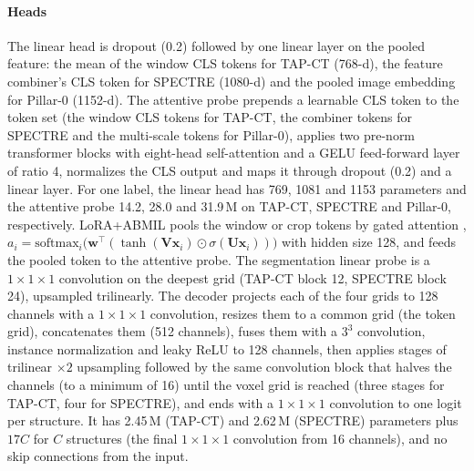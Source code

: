 \paragraph{Heads} The linear head is dropout (0.2) followed by one linear layer on the pooled feature: the mean of the window CLS tokens for TAP-CT (768-d), the feature combiner's CLS token for SPECTRE (1080-d) and the pooled image embedding for Pillar-0 (1152-d). The attentive probe prepends a learnable CLS token to the token set (the window CLS tokens for TAP-CT, the combiner tokens for SPECTRE and the multi-scale tokens for Pillar-0), applies two pre-norm transformer blocks with eight-head self-attention and a GELU feed-forward layer of ratio 4, normalizes the CLS output and maps it through dropout (0.2) and a linear layer. For one label, the linear head has 769, 1081 and 1153 parameters and the attentive probe 14.2, 28.0 and 31.9\,M on TAP-CT, SPECTRE and Pillar-0, respectively. LoRA+ABMIL pools the window or crop tokens by gated attention \citep{ilse2018abmil}, $a_i=\mathrm{softmax}_i\big(\bm{w}^\top(\tanh(\bm{V}\bm{x}_i)\odot\sigma(\bm{U}\bm{x}_i))\big)$ with hidden size 128, and feeds the pooled token to the attentive probe. The segmentation linear probe is a $1\times1\times1$ convolution on the deepest grid (TAP-CT block 12, SPECTRE block 24), upsampled trilinearly. The decoder projects each of the four grids to 128 channels with a $1\times1\times1$ convolution, resizes them to a common grid (the token grid), concatenates them (512 channels), fuses them with a $3^3$ convolution, instance normalization and leaky ReLU to 128 channels, then applies stages of trilinear $\times2$ upsampling followed by the same convolution block that halves the channels (to a minimum of 16) until the voxel grid is reached (three stages for TAP-CT, four for SPECTRE), and ends with a $1\times1\times1$ convolution to one logit per structure. It has 2.45\,M (TAP-CT) and 2.62\,M (SPECTRE) parameters plus $17C$ for $C$ structures (the final $1\times1\times1$ convolution from 16 channels), and no skip connections from the input.

